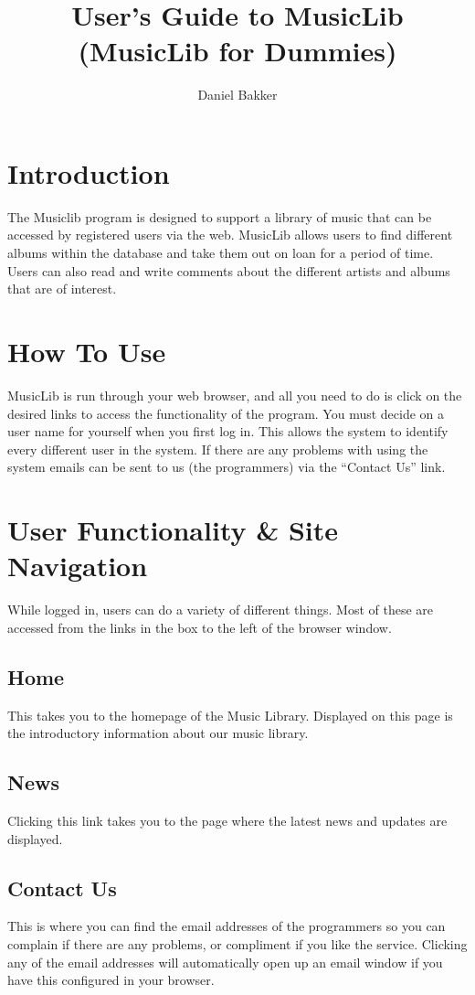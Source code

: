 \documentclass{article}
\title{User's Guide to MusicLib (MusicLib for Dummies)}
\author{Daniel Bakker}
\begin{document}
\maketitle
\tableofcontents

\section{Introduction}
The Musiclib program is designed to support a library of music that can be accessed by registered users via the web. MusicLib allows users to find different albums within the database and take them out on loan for a period of time. Users can also read and write comments about the different artists and albums that are of interest.

\section{How To Use}
MusicLib is run through your web browser, and all you need to do is click on the desired links to access the functionality of the program. You must decide on a user name for yourself when you first log in. This allows the system to identify every different user in the system. If there are any problems with using the system emails can be sent to us (the programmers) via the ``Contact Us'' link.  

\section{User Functionality & Site Navigation}
While logged in, users can do a variety of different things. Most of these are accessed from the links in the box to the left of the browser window.
\subsection{Home}
This takes you to the homepage of the Music Library. Displayed on this page is the introductory information about our music library.
\subsection{News}
Clicking this link takes you to the page where the latest news and updates are displayed.
\subsection{Contact Us}
This is where you can find the email addresses of the programmers so you can complain if there are any problems, or compliment if you like the service. Clicking any of the email addresses will automatically open up an email window if you have this configured in your browser.
\end{document}
